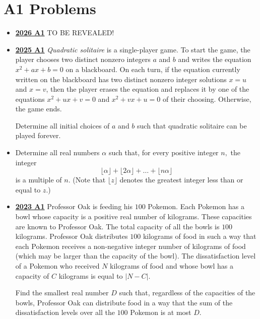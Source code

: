 \documentclass[11pt]{scrartcl}
\begin{document}
\section*{A1 Problems} \label{A1} 
\begin{itemize}[leftmargin=*]


\item \href{https://www.imo-official.org/assets/documents/problems/2026/IMO2026SL.pdf}{\textbf{2026 A1}} TO BE REVEALED!

\item \href{https://artofproblemsolving.com/community/c6h3866863p38676959}{\textbf{2025 A1}} \textit{Quadratic solitaire} is a single-player game. To start the game, the player chooses two distinct nonzero integers $a$ and $b$ and writes the equation $x^2+ax+b=0$ on a blackboard. On each turn, if the equation currently written on the blackboard has two distinct nonzero integer solutions $x=u$ and $x=v$, then the player erases the equation and replaces it by one of the equations $x^2+ux+v=0$ and $x^2+vx+u=0$ of their choosing. Otherwise, the game ends. 

Determine all initial choices of $a$ and $b$ such that quadratic solitaire can be played forever.
\item {} Determine all real numbers $\alpha$ such that, for every positive integer $n,$ the integer
$$\lfloor\alpha\rfloor +\lfloor 2\alpha\rfloor +\dots +\lfloor n\alpha\rfloor$$is a multiple of $n.$ (Note that $\lfloor z\rfloor$ denotes the greatest integer less than or equal to $z$.)
\item \href{https://artofproblemsolving.com/community/c6h3359728p31218381}{\textbf{2023 A1}} Professor Oak is feeding his $100$ Pokemon. Each Pokemon has a bowl whose capacity is a positive real number of kilograms. These capacities are known to Professor Oak. The total capacity of all the bowls is $100$ kilograms. Professor Oak distributes $100$ kilograms of food in such a way that each Pokemon receives a non-negative integer number of kilograms of food (which may be larger than the capacity of the bowl). The dissatisfaction level of a Pokemon who received $N$ kilograms of food and whose bowl has a capacity of $C$ kilograms is equal to $\lvert N-C\rvert$.

Find the smallest real number $D$ such that, regardless of the capacities of the bowls, Professor Oak can distribute food in a way that the sum of the dissatisfaction levels over all the $100$ Pokemon is at most $D$.


\end{itemize}
\end{document}
